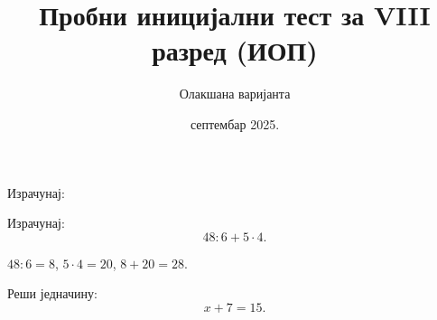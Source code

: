 \documentclass[11pt,a5paper,twoside,addpoints,noanswers]{exam} %
\title{Пробни иницијални тест за VIII разред (ИОП)}
\author{Олакшана варијанта}
\date{септембар 2025.}
\begin{document}
\maketitle
\thispagestyle{headandfoot}

\ifprintanswers\else
\begin{flushleft}
\gradetable[v]\newpage
\end{flushleft}
\fi

\begin{questions}

\question[6]
Израчунај:
\begin{multicols}{3}
\end{multicols}

\begin{solution}[\stretch 1]
\end{solution}

\question[6]
Израчунај:
\[
48 : 6 + 5 \cdot 4.
\]

\begin{solution}[\stretch 1]
$48:6=8$, $5\cdot4=20$, $8+20=28$.
\end{solution}

\ifprintanswers\else\newpage\fi

\question[6]
Реши једначину:
\[
x+7=15.
\]


\end{questions}
\end{document}
